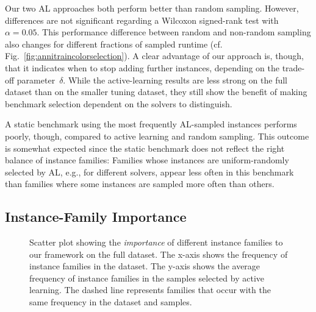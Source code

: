 \documentclass[runningheads]{llncs}
\begin{document}
Our two AL approaches both perform better than random sampling.
However, differences are not significant regarding a Wilcoxon signed-rank test with $\alpha = 0.05$.
This performance difference between random and non-random sampling also changes for different fractions of sampled runtime (cf. Fig.~\ref{fig:annitraincolorselection}).
A clear advantage of our approach is, though, that it indicates when to stop adding further instances, depending on the trade-off parameter~$\delta$.
While the active-learning results are less strong on the full dataset than on the smaller tuning dataset, they still show the benefit of making benchmark selection dependent on the solvers to distinguish.

A static benchmark using the most frequently AL-sampled instances performs poorly, though, compared to active learning and random sampling.
This outcome is somewhat expected since the static benchmark does not reflect the right balance of instance families:
Families whose instances are uniform-randomly selected by AL, e.g., for different solvers, appear less often in this benchmark than families where some instances are sampled more often than others.

\subsection{Instance-Family Importance}

\begin{figure}[tb]
  \centering
  \caption{
    Scatter plot showing the \emph{importance} of different instance families to our framework on the full dataset.
    The x-axis shows the frequency of instance families in the dataset.
    The y-axis shows the average frequency of instance families in the samples selected by active learning.
    The dashed line represents families that occur with the same frequency in the dataset and samples.
  }
  \label{fig:annifinalfamilies}
\end{figure}
\end{document}

